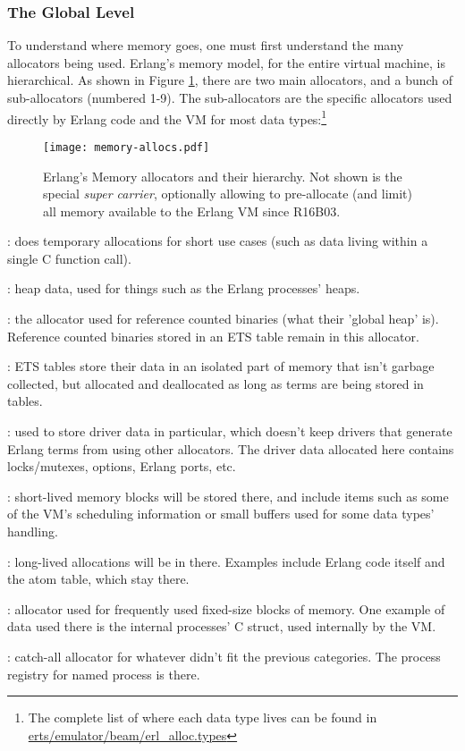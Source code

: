 \subsubsection{The Global Level}

To understand where memory goes, one must first understand the many allocators being used. Erlang's memory model, for the entire virtual machine, is hierarchical. As shown in Figure \ref{fig:allocators},  there are two main allocators, and a bunch of sub-allocators (numbered 1-9). The sub-allocators are the specific allocators used directly by Erlang code and the VM for most data types:\footnote{The complete list of where each data type lives can be found in \href{https://github.com/erlang/otp/blob/maint/erts/emulator/beam/erl\_alloc.types}{erts/emulator/beam/erl\_alloc.types}}


\begin{figure}
  \texttt{[image: memory-allocs.pdf]}%
  \caption{Erlang's Memory allocators and their hierarchy. Not shown is the special \emph{super carrier}, optionally allowing to pre-allocate (and limit) all memory available to the Erlang VM since R16B03.}%
   \label{fig:allocators}
\end{figure}

\begin{enumerate*}
    \item {}: does temporary allocations for short use cases (such as data living within a single C function call).
    \item {}: heap data, used for things such as the Erlang processes' heaps.
    \item {}: the allocator used for reference counted binaries (what their 'global heap' is). Reference counted binaries stored in an ETS table remain in this allocator.
    \item {}: ETS tables store their data in an isolated part of memory that isn't garbage collected, but allocated and deallocated as long as terms are being stored in tables.
    \item {}: used to store driver data in particular, which doesn't keep drivers that generate Erlang terms from using other allocators. The driver data allocated here contains locks/mutexes, options, Erlang ports, etc.
    \item {}: short-lived memory blocks will be stored there, and include items such as some of the VM's scheduling information or small buffers used for some data types' handling.
    \item {}: long-lived allocations will be in there. Examples include Erlang code itself and the atom table, which stay there.
    \item {}: allocator used for frequently used fixed-size blocks of memory. One example of data used there is the internal processes' C struct, used internally by the VM.
    \item {}: catch-all allocator for whatever didn't fit the previous categories. The process registry for named process is there.
\end{enumerate*}

